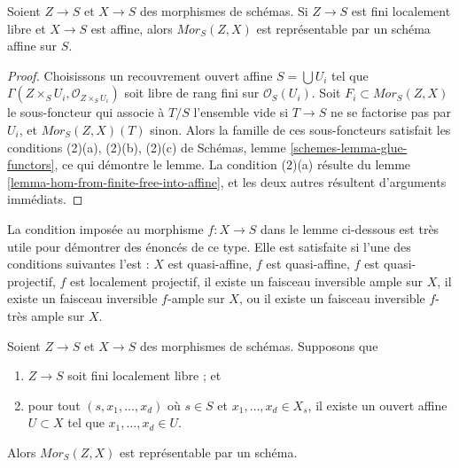 \begin{lemma}
\label{lemma-hom-from-finite-locally-free-into-affine}
Soient $Z \to S$ et $X \to S$ des morphismes de schémas.
Si $Z \to S$ est fini localement libre et $X \to S$ est affine,
alors $\mathit{Mor}_S(Z, X)$ est représentable par un schéma
affine sur $S$.
\end{lemma}

\begin{proof}
Choisissons un recouvrement ouvert affine $S = \bigcup U_i$ tel que
$\Gamma(Z \times_S U_i, \mathcal{O}_{Z \times_S U_i})$ soit
libre de rang fini sur $\mathcal{O}_S(U_i)$. Soit $F_i \subset \mathit{Mor}_S(Z, X)$
le sous-foncteur qui associe à $T/S$ l'ensemble vide si
$T \to S$ ne se factorise pas par $U_i$, et $\mathit{Mor}_S(Z, X)(T)$
sinon. Alors la famille de ces sous-foncteurs satisfait les conditions
(2)(a), (2)(b), (2)(c) de
Schémas, lemme \ref{schemes-lemma-glue-functors}, ce qui démontre le lemme.
La condition (2)(a) résulte du
lemme \ref{lemma-hom-from-finite-free-into-affine},
et les deux autres résultent d'arguments immédiats.
\end{proof}

\noindent
La condition imposée au morphisme $f : X \to S$ dans le lemme ci-dessous est très
utile pour démontrer des énoncés de ce type. Elle est satisfaite si l'une des conditions suivantes
l'est : $X$ est quasi-affine, $f$ est quasi-affine, $f$ est quasi-projectif,
$f$ est localement projectif, il existe un faisceau inversible ample sur $X$,
il existe un faisceau inversible $f$-ample sur $X$, ou
il existe un faisceau inversible $f$-très ample sur $X$.

\begin{lemma}
\label{lemma-hom-from-finite-locally-free-representable}
Soient $Z \to S$ et $X \to S$ des morphismes de schémas.
Supposons que
\begin{enumerate}
\item $Z \to S$ soit fini localement libre ; et
\item pour tout $(s, x_1, \ldots, x_d)$ où $s \in S$ et
$x_1, \ldots, x_d \in X_s$, il existe un ouvert affine $U \subset X$
tel que $x_1, \ldots, x_d \in U$.
\end{enumerate}
Alors $\mathit{Mor}_S(Z, X)$ est représentable par un schéma.
\end{lemma}

